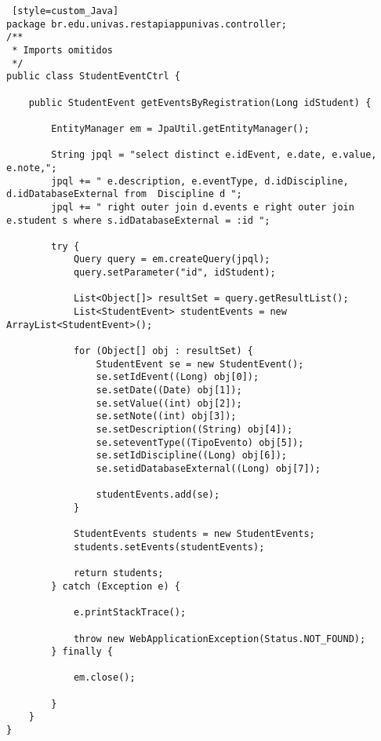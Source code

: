 \begin{lstlisting} [style=custom_Java]
package br.edu.univas.restapiappunivas.controller;
/**
 * Imports omitidos
 */
public class StudentEventCtrl {

	public StudentEvent getEventsByRegistration(Long idStudent) {
		
		EntityManager em = JpaUtil.getEntityManager();
		
		String jpql = "select distinct e.idEvent, e.date, e.value, e.note,";
		jpql += " e.description, e.eventType, d.idDiscipline, d.idDatabaseExternal from  Discipline d "; 
		jpql += " right outer join d.events e right outer join e.student s where s.idDatabaseExternal = :id ";

		try {
			Query query = em.createQuery(jpql);
			query.setParameter("id", idStudent);

			List<Object[]> resultSet = query.getResultList();
			List<StudentEvent> studentEvents = new ArrayList<StudentEvent>();

			for (Object[] obj : resultSet) {
				StudentEvent se = new StudentEvent();
				se.setIdEvent((Long) obj[0]);
				se.setDate((Date) obj[1]);
				se.setValue((int) obj[2]);
				se.setNote((int) obj[3]);
				se.setDescription((String) obj[4]);
				se.seteventType((TipoEvento) obj[5]);
				se.setIdDiscipline((Long) obj[6]);
				se.setidDatabaseExternal((Long) obj[7]);

				studentEvents.add(se);
			}

			StudentEvents students = new StudentEvents;
			students.setEvents(studentEvents);

			return students;
		} catch (Exception e) {

			e.printStackTrace();

			throw new WebApplicationException(Status.NOT_FOUND);
		} finally {

			em.close();

		}
	}
}
	
\end{lstlisting}
